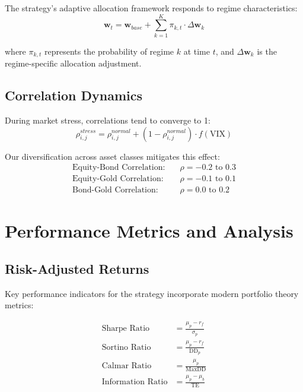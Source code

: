 \documentclass[onecolumn,11pt]{IEEEtran}
\begin{document}
The strategy's adaptive allocation framework responds to regime characteristics:
\begin{equation}
\mathbf{w}_t = \mathbf{w}_{base} + \sum_{k=1}^K \pi_{k,t} \cdot \Delta\mathbf{w}_k
\end{equation}

where $\pi_{k,t}$ represents the probability of regime $k$ at time $t$, and $\Delta\mathbf{w}_k$ is the regime-specific allocation adjustment.

\subsection{Correlation Dynamics}

During market stress, correlations tend to converge to 1:
\begin{equation}
\rho_{i,j}^{stress} = \rho_{i,j}^{normal} + (1 - \rho_{i,j}^{normal}) \cdot f(\text{VIX})
\end{equation}

Our diversification across asset classes mitigates this effect:
\begin{align}
\text{Equity-Bond Correlation:} &\quad \rho = -0.2 \text{ to } 0.3 \\
\text{Equity-Gold Correlation:} &\quad \rho = -0.1 \text{ to } 0.1 \\
\text{Bond-Gold Correlation:} &\quad \rho = 0.0 \text{ to } 0.2
\end{align}

\section{Performance Metrics and Analysis}

\subsection{Risk-Adjusted Returns}

Key performance indicators for the strategy incorporate modern portfolio theory metrics:

\begin{align}
\text{Sharpe Ratio} &= \frac{\mu_p - r_f}{\sigma_p} \\
\text{Sortino Ratio} &= \frac{\mu_p - r_f}{\text{DD}_p} \\
\text{Calmar Ratio} &= \frac{\mu_p}{\text{MaxDD}} \\
\text{Information Ratio} &= \frac{\mu_p - \mu_b}{\text{TE}}
\end{align}
\end{document}
